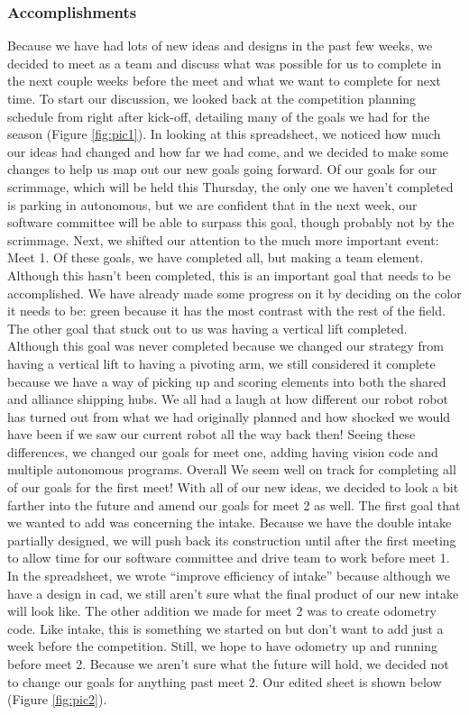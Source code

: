 \subsubsection*{Accomplishments}
Because we have had lots of new ideas and designs in the past few weeks, we decided to meet as a team and discuss what was possible for us to complete in the next couple weeks before the meet and what we want to complete for next time. To start our discussion, we looked back at the competition planning schedule from right after kick-off, detailing many of the goals we had for the season (Figure \ref{fig:pic1}). In looking at this spreadsheet, we noticed how much our ideas had changed and how far we had come, and we decided to make some changes to help us map out our new goals going forward. 
Of our goals for our scrimmage, which will be held this Thursday, the only one we haven't completed is parking in autonomous, but we are confident that in the next week, our software committee will be able to surpass this goal, though probably not by the scrimmage. 
Next, we shifted our attention to the much more important event: Meet 1. Of these goals, we have completed all, but making a team element. Although this hasn’t been completed, this is an important goal that needs to be accomplished. We have already made some progress on it by deciding on the color it needs to be: green because it has the most contrast with the rest of the field. The other goal that stuck out to us was having a vertical lift completed. Although this goal was never completed because we changed our strategy from having a vertical lift to having a pivoting arm, we still considered it complete because we have a way of picking up and scoring elements into both the shared and alliance shipping hubs. We all had a laugh at how different our robot robot has turned out from what we had originally planned and how shocked we would have been if we saw our current robot all the way back then! Seeing these differences, we changed our goals for meet one, adding having vision code and multiple autonomous programs. Overall We seem well on track for completing all of our goals for the first meet!
With all of our new ideas, we decided to look a bit farther into the future and amend our goals for meet 2 as well. The first goal that we wanted to add was concerning the intake. Because we have the double intake partially designed, we will push back its construction until after the first meeting to allow time for our software committee and drive team to work before meet 1. In the spreadsheet, we wrote “improve efficiency of intake” because although we have a design in cad, we still aren't sure what the final product of our new intake will look like. The other addition we made for meet 2 was to create odometry code. Like intake, this is something we started on but don’t want to add just a week before the competition. Still, we hope to have odometry up and running before meet 2. Because we aren't sure what the future will hold, we decided not to change our goals for anything past meet 2. Our edited sheet is shown below (Figure \ref{fig:pic2}).

